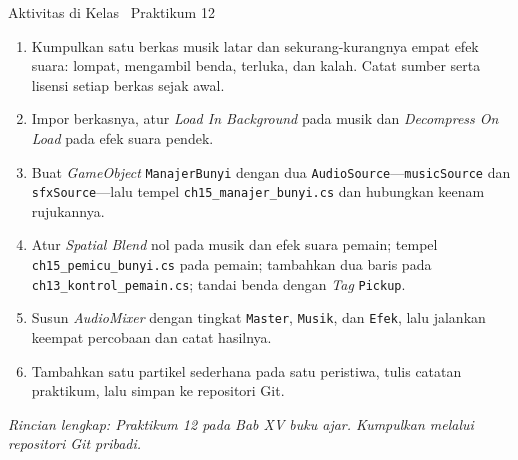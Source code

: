 \documentclass[aspectratio=169,10pt]{beamer}
\begin{document}
\begin{frame}{Aktivitas di Kelas \textperiodcentered\ Praktikum 12}
\begin{enumerate}
  \item Kumpulkan satu berkas musik latar dan sekurang-kurangnya empat efek
        suara: lompat, mengambil benda, terluka, dan kalah. Catat sumber serta
        lisensi setiap berkas sejak awal.
  \item Impor berkasnya, atur \emph{Load In Background} pada musik dan
        \emph{Decompress On Load} pada efek suara pendek.
  \item Buat \emph{GameObject} \texttt{ManajerBunyi} dengan dua
        \texttt{AudioSource}---\texttt{musicSource} dan \texttt{sfxSource}---lalu
        tempel \texttt{ch15\_manajer\_bunyi.cs} dan hubungkan keenam rujukannya.
  \item Atur \emph{Spatial Blend} nol pada musik dan efek suara pemain; tempel
        \texttt{ch15\_pemicu\_bunyi.cs} pada pemain; tambahkan dua baris pada
        \texttt{ch13\_kontrol\_pemain.cs}; tandai benda dengan \emph{Tag}
        \texttt{Pickup}.
  \item Susun \emph{AudioMixer} dengan tingkat \texttt{Master}, \texttt{Musik},
        dan \texttt{Efek}, lalu jalankan keempat percobaan dan catat hasilnya.
  \item Tambahkan satu partikel sederhana pada satu peristiwa, tulis catatan
        praktikum, lalu simpan ke repositori Git.
\end{enumerate}
\vspace{0.08cm}
{\footnotesize\color{ubAccent}\itshape Rincian lengkap: Praktikum 12 pada
Bab XV buku ajar. Kumpulkan melalui repositori Git pribadi.}
\end{frame}
\end{document}

